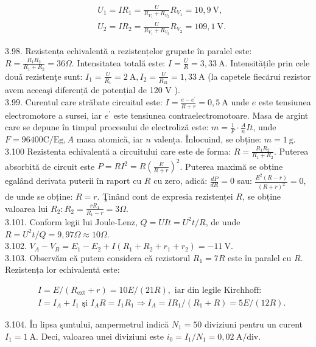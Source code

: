 $$
\begin{aligned}
& U_{1}=I R_{1}=\frac{U}{R_{V_{1}}+R_{V_{2}}} R_{V_{1}}=10,9 \mathrm{~V}, \\
& U_{2}=I R_{2}=\frac{U}{R_{V_{1}}+R_{V_{2}}} R_{V_{2}}=109,1 \mathrm{~V} .
\end{aligned}
$$

3.98. Rezistența echivalentă a rezistențelor grupate în paralel este: $R=\frac{R_{1} R_{2}}{R_{1}+R_{2}}=36 \Omega$. Intensitatea totală este: $I=\frac{U}{R}=3,33 \mathrm{~A}$. Intensitățile prin cele douǎ rezistenţe sunt: $I_{1}=\frac{U}{R_{1}}=2 \mathrm{~A}, I_{2}=\frac{U}{R_{21}}=1,33 \mathrm{~A}$ (la capetele fiecărui rezistor avem aceeaşi diferență de potențial de 120 V ).\\
3.99. Curentul care străbate circuitul este: $I=\frac{e-e^{\prime}}{R+r}=0,5 \mathrm{~A}$ unde $e$ este tensiunea electromotore a sursei, iar $e^{\prime}$ este tensiunea contraelectromotoare. Masa de argint care se depune în timpul procesului de electroliză este: $m=\frac{1}{F} \cdot \frac{A}{n} I t$, unde $F=96400 \mathrm{C} / \mathrm{Eg}, A$ masa atomică, iar $n$ valența. Înlocuind, se obține: $m=1 \mathrm{~g}$.\\
3.100 Rezistenta echivalentă a circuitului care este de forma: $R=\frac{R_{1} R_{2}}{R_{1}+R_{2}}$. Puterea absorbită de circuit este $P=R I^{2}=R\left(\frac{E}{R+r}\right)^{2}$. Puterea maximă se obține egalând derivata puterii în raport cu $R$ cu zero, adică: $\frac{d P}{d R}=0$ sau: $\frac{E^{2}(R-r)}{(R+r)^{2}}=0$, de unde se obține: $R=r$. Ţinând cont de expresia rezistenței $R$, se obține valoarea lui $R_{2}: R_{2}=\frac{r R_{1}}{R_{1}-r}=3 \Omega$.\\
3.101. Conform legii lui Joule-Lenz, $Q=U I t=U^{2} t / R$, de unde $R=U^{2} t / Q=9,97 \Omega \approx 10 \Omega$.\\
3.102. $V_{A}-V_{B}=E_{1}-E_{2}+I\left(R_{1}+R_{2}+r_{1}+r_{2}\right)=-11 \mathrm{~V}$.\\
3.103. Observăm că putem considera că rezistorul $R_{1}=7 R$ este în paralel cu $R$. Rezistența lor echivalentă este:

$$
\begin{aligned}
& I=E /\left(R_{\mathrm{ext}}+r\right)=10 E /(21 R), \text { iar din legile Kirchhoff: } \\
& I=I_{A}+I_{1} \text { şi } I_{A} R=I_{1} R_{1} \Rightarrow I_{A}=I R_{1} /\left(R_{1}+R\right)=5 E /(12 R) .
\end{aligned}
$$

3.104. În lipsa şuntului, ampermetrul indică $N_{1}=50$ diviziuni pentru un curent $I_{1}=1 \mathrm{~A}$. Deci, valoarea unei diviziuni este $i_{0}=I_{1} / N_{1}=0,02 \mathrm{~A} / \mathrm{div}$.

